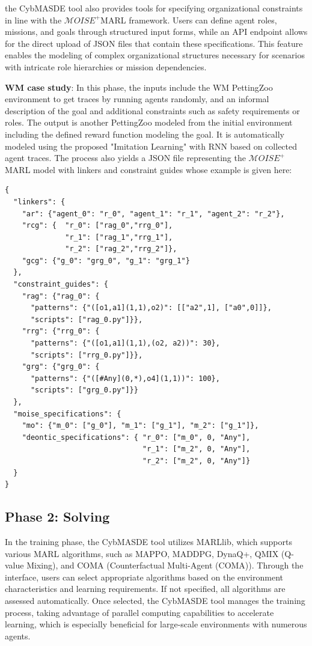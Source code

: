 \documentclass[pdflatex,sn-mathphys-num]{sn-jnl}%
\theoremstyle{thmstyleone}%
\theoremstyle{thmstyletwo}%
\theoremstyle{thmstylethree}%
\begin{document}
the CybMASDE tool also provides tools for specifying organizational constraints in line with the $\mathcal{M}OISE^+$MARL framework. Users can define agent roles, missions, and goals through structured input forms, while an API endpoint allows for the direct upload of JSON files that contain these specifications. This feature enables the modeling of complex organizational structures necessary for scenarios with intricate role hierarchies or mission dependencies.

\textbf{WM case study}: In this phase, the inputs include the WM PettingZoo environment to get traces by running agents randomly, and an informal description of the goal and additional constraints such as safety requirements or roles.
The output is another PettingZoo modeled from the initial environment including the defined reward function modeling the goal. It is automatically modeled using the proposed "Imitation Learning" with RNN based on collected agent traces. The process also yields a JSON file representing the $\mathcal{M}OISE^+$MARL model with linkers and constraint guides whose example is given here:

{
\footnotesize
\begin{verbatim}
{ 
  "linkers": {
    "ar": {"agent_0": "r_0", "agent_1": "r_1", "agent_2": "r_2"},
    "rcg": {  "r_0": ["rag_0","rrg_0"],
              "r_1": ["rag_1","rrg_1"],
              "r_2": ["rag_2","rrg_2"]},
    "gcg": {"g_0": "grg_0", "g_1": "grg_1"}
  },
  "constraint_guides": {
    "rag": {"rag_0": {
      "patterns": {"([o1,a1](1,1),o2)": [["a2",1], ["a0",0]]},
      "scripts": ["rag_0.py"]}},
    "rrg": {"rrg_0": {
      "patterns": {"([o1,a1](1,1),(o2, a2))": 30},
      "scripts": ["rrg_0.py"]}},
    "grg": {"grg_0": {
      "patterns": {"([#Any](0,*),o4](1,1))": 100},
      "scripts": ["grg_0.py"]}}
  },
  "moise_specifications": {
    "mo": {"m_0": ["g_0"], "m_1": ["g_1"], "m_2": ["g_1"]},
    "deontic_specifications": { "r_0": ["m_0", 0, "Any"],
                                "r_1": ["m_2", 0, "Any"],
                                "r_2": ["m_2", 0, "Any"]}
  }
}
\end{verbatim}
}

\subsection{Phase 2: Solving}

In the training phase, the CybMASDE tool utilizes MARLlib, which supports various MARL algorithms, such as MAPPO, MADDPG, DynaQ+, QMIX (Q-value Mixing), and COMA (Counterfactual Multi-Agent (COMA)). Through the interface, users can select appropriate algorithms based on the environment characteristics and learning requirements. If not specified, all algorithms are assessed automatically. Once selected, the CybMASDE tool manages the training process, taking advantage of parallel computing capabilities to accelerate learning, which is especially beneficial for large-scale environments with numerous agents.
\end{document}
